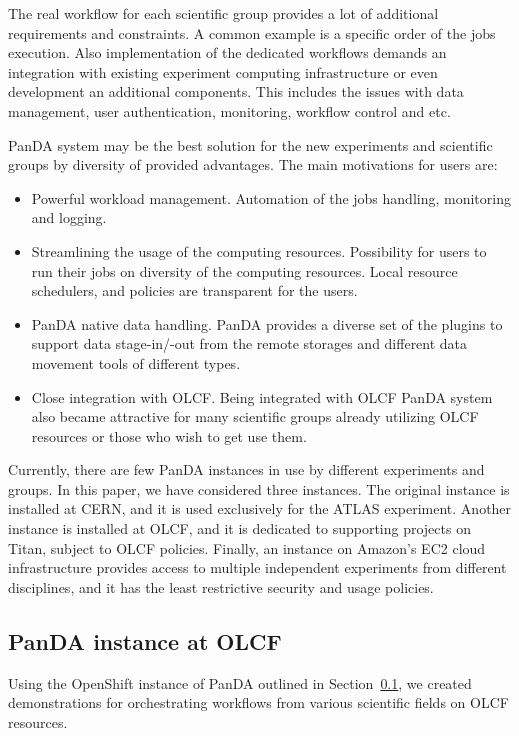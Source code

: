 The real workflow for each scientific group provides a lot of additional
requirements and constraints. A common example is a specific order of the jobs
execution. Also implementation of the dedicated workflows demands an
integration with existing experiment computing infrastructure or even
development an additional components. This includes the issues with data
management, user authentication, monitoring, workflow control and etc.

PanDA system may be the best solution for the new experiments and scientific
groups by diversity of provided advantages. The main motivations for users are:
\begin{itemize}
    \item Powerful workload management. Automation of the jobs handling,
        monitoring and logging.
    \item Streamlining the usage of the computing resources. Possibility for
        users to run their jobs on diversity of the computing resources. Local
        resource schedulers, and policies are transparent for the users.
    \item PanDA native data handling. PanDA provides a diverse set of the
        plugins to support data stage-in/-out from the remote storages and
        different data movement tools of different types.
    \item Close integration with OLCF. Being integrated with OLCF PanDA system
        also became attractive for many scientific groups already utilizing
        OLCF resources or those who wish to get use them. 
\end{itemize}

Currently, there are few PanDA instances in use by different experiments and
groups.  In this paper, we have considered three instances. The original
instance is installed at CERN, and it is used exclusively for the ATLAS
experiment. Another instance is installed at OLCF, and it is dedicated to
supporting projects on Titan, subject to OLCF policies. Finally, an instance on
Amazon's EC2 cloud infrastructure provides access to multiple independent
experiments from different disciplines, and it has the least restrictive
security and usage policies.

\subsection{PanDA instance at OLCF}
\label{subsec:panda_instance}

Using the OpenShift instance of PanDA outlined in Section~\ref{subsec:panda_instance}, we created demonstrations for orchestrating workflows from various
scientific fields on OLCF resources.

